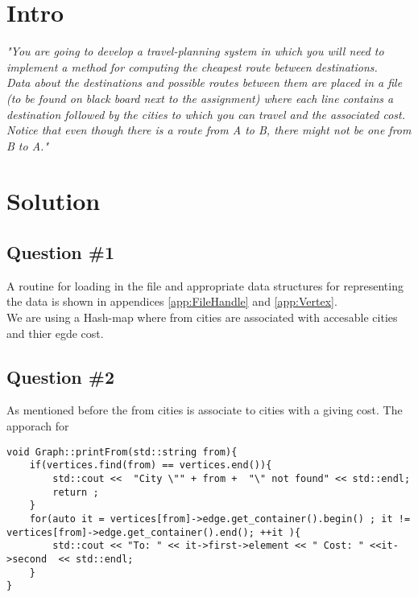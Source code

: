 \section{Intro}
\label{sec:intro}
\textit{"You are going to develop a travel-planning system in which you will need to implement a method for computing the cheapest route between destinations. \\
Data about the destinations and possible routes between them are placed in a file (to be found on black board next to the assignment) where each line contains a destination followed by the cities to which you can travel and the associated cost. \\
Notice that even though there is a route from A to B, there might not be one from B to A."}


\section{Solution}
\subsection{Question \#1}
A routine for loading in the file and appropriate data structures for representing the data is shown in appendices \ref{app:FileHandle} and \ref{app:Vertex}.\\
We are using a Hash-map where from cities are associated with accesable cities and thier egde cost.



\subsection{Question \#2}

As mentioned before the from cities is associate to cities with a giving cost. The apporach for




\begin{lstlisting}
void Graph::printFrom(std::string from){
	if(vertices.find(from) == vertices.end()){
		std::cout <<  "City \"" + from +  "\" not found" << std::endl;
		return ;
	}
	for(auto it = vertices[from]->edge.get_container().begin() ; it != vertices[from]->edge.get_container().end(); ++it ){
		std::cout << "To: " << it->first->element << " Cost: " <<it->second  << std::endl;
	}
} 
\end{lstlisting}
\bigskip

